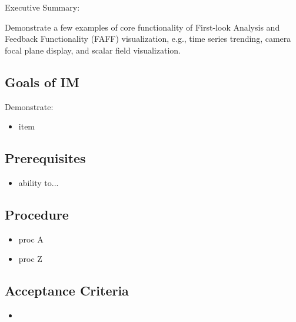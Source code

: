
Executive Summary:

Demonstrate a few examples of core functionality of First-look Analysis and Feedback Functionality (FAFF) visualization, e.g., time series trending, camera focal plane display, and scalar field visualization.

\subsection{Goals of IM}
Demonstrate:
\begin{itemize}
\item item
\end{itemize}

\subsection{Prerequisites}
\begin{itemize}
\item ability to...
\end{itemize}

\subsection{Procedure}
\begin{itemize}
\item proc A
\item proc Z
\end{itemize}

\subsection{Acceptance Criteria}
\begin{itemize}
\item
\end{itemize}